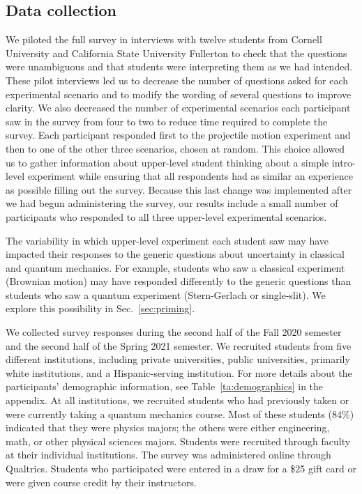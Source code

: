 \documentclass[english,aps,prstper,reprint,showpacs,longbibliography,superscriptaddress,nofootinbib]{revtex4-2}
\begin{document}
\subsection{Data collection}
\label{sec:data_collection}

We piloted the full survey in interviews with twelve students from Cornell University and California State University Fullerton to check that the questions were unambiguous and that students were interpreting them as we had intended. These pilot interviews led us to decrease the number of questions asked for each experimental scenario and to modify the wording of several questions to improve clarity. We also decreased the number of experimental scenarios each participant saw in the survey from four to two to reduce time required to complete the survey. Each participant responded first to the projectile motion experiment and then to one of the other three scenarios, chosen at random. This choice allowed us to gather information about upper-level student thinking about a simple intro-level experiment while ensuring that all respondents had as similar an experience as possible filling out the survey. Because this last change was implemented after we had begun administering the survey, our results include a small number of participants who responded to all three upper-level experimental scenarios.


The variability in which upper-level experiment each student saw may have impacted their responses to the generic questions about uncertainty in classical and quantum mechanics. For example, students who saw a classical experiment (Brownian motion) may have responded differently to the generic questions than students who saw a quantum experiment (Stern-Gerlach or single-slit). We explore this possibility in Sec.~\ref{sec:priming}. 

We collected survey responses during the second half of the Fall 2020 semester and the second half of the Spring 2021 semester. We recruited students from five different institutions, including private universities, public universities, primarily white institutions, and a Hispanic-serving institution. For more details about the participants' demographic information, see Table~\ref{ta:demographics} in the appendix. At all institutions, we recruited students who had previously taken or were currently taking a quantum mechanics course. Most of these students (84\%) indicated that they were physics majors; the others were either engineering, math, or other physical sciences majors. Students were recruited through faculty at their individual institutions. The survey was administered online through Qualtrics. Students who participated were entered in a draw for a \$25 gift card or were given course credit by their instructors.
\end{document}
